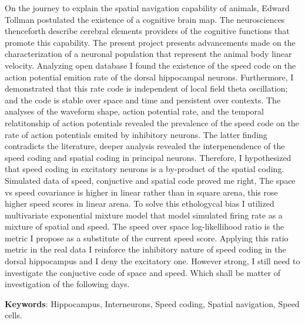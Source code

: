 On the journey to explain the spatial navigation capability of animals, Edward Tollman postulated the existence of a cognitive brain map.
The neurosciences thenceforth describe cerebral elements providers of the cognitive functions that promote this capability.
The present project presents advancements made on the characterization of a neuronal population that represent the animal body linear velocity.
Analyzing open database I found the existence of the speed code on the action potential emition rate of the dorsal hippocampal neurons.
Furthermore, I demonstrated that this rate code is independent of local field theta oscillation; and the code is stable over space and time and persistent over contexts.
The analyses of the waveform shape, action potential rate, and the temporal relatitonship of action potentials revealed the prevalence of the speed code on the rate of action potentials emited by inhibitory neurons.
The latter finding contradicts the literature, deeper analysis revealed the interpenendence of the speed coding and spatial coding in principal neurons. Therefore, I hypothesized that speed coding in excitatory neurons is a by-product of the spatial coding.
Simulated data of speed, conjuctive and spatial code proved me right, The space vs speed covariance is higher in linear rather than in square arena, this rose higher speed scores in linear arena. 
To solve this ethologycal bias I utilized multivariate exponential mixture model that model simulated firing rate as a mixture of spatial and speed. The speed over space log-likellihood ratio is the metric I propose as a substitute of the current speed score.
Applying this ratio metric in the real data I reinforce the inhibitory nature of speed coding in the dorsal hippocampus and I deny the excitatory one. However strong, I still need to investigate the conjuctive code of space and speed. Which shall be matter of investigation of the following days.

\vspace{1.5ex}

{\bf Keywords}: Hippocampus, Interneurons, Speed coding, Spatial navigation, Speed cells.
